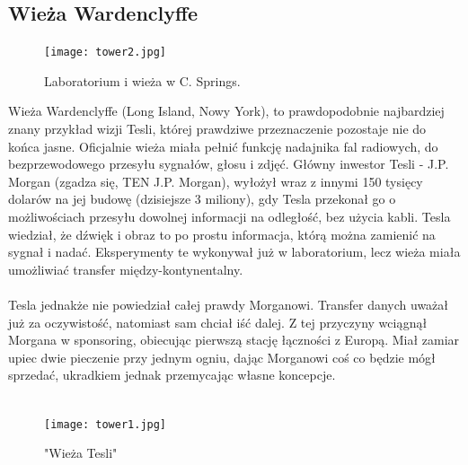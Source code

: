 \documentclass{article}
\begin{document}
\begin{large}
\subsection{Wieża Wardenclyffe}

\begin{figure}
\vspace{-15pt}
\texttt{[image: tower2.jpg]}
\vspace{-15pt}
\caption{Laboratorium i wieża w C. Springs.}
\vspace{0pt}
\end{figure}


Wieża Wardenclyffe (Long Island, Nowy York), to prawdopodobnie najbardziej znany przykład wizji Tesli, której prawdziwe przeznaczenie pozostaje nie do końca jasne. Oficjalnie wieża miała pełnić funkcję nadajnika fal radiowych, do bezprzewodowego przesyłu sygnałów, głosu i zdjęć. Główny inwestor Tesli - J.P. Morgan (zgadza się, TEN J.P. Morgan), wyłożył wraz z innymi 150 tysięcy dolarów na jej budowę (dzisiejsze 3 miliony), gdy Tesla przekonał go o możliwościach przesyłu dowolnej informacji na odległość, bez użycia kabli. Tesla wiedział, że dźwięk i obraz to po prostu informacja, którą można zamienić na sygnał i nadać. Eksperymenty te wykonywał już w laboratorium, lecz wieża miała umożliwiać transfer między-kontynentalny.
\\
\\
\indent Tesla jednakże nie powiedział całej prawdy Morganowi. Transfer danych uważał już za oczywistość, natomiast sam chciał iść dalej. Z tej przyczyny wciągnął Morgana w sponsoring, obiecując pierwszą stację łączności z Europą. Miał zamiar upiec dwie pieczenie przy jednym ogniu, dając Morganowi coś co będzie mógł sprzedać, ukradkiem jednak przemycając własne koncepcje.
\\
\\

\begin{figure}
\vspace{-15pt}
\texttt{[image: tower1.jpg]}
\vspace{-15pt}
\caption{"Wieża Tesli"}
\vspace{0pt}
\end{figure}


\end{large}
\end{document}
